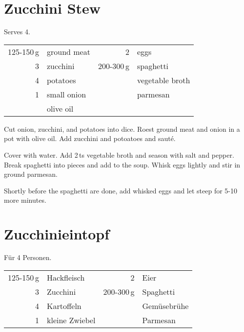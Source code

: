 \section{Zucchini Stew}

\begin{centering}

Serves 4.

\end{centering}

\begin{table}[H]
  \centering
    
  \begin{tabular*}{1\textwidth}{rlrl}
125-150\,g & ground meat & 2 & eggs \\
3 & zucchini & 200-300\,g & spaghetti \\
4 & potatoes & & vegetable broth \\
1 & small onion & & parmesan \\
 & olive oil & & \\
\end{tabular*}
\end{table}

\begin{Notes}
\item Cut onion, zucchini, and potatoes into dice. Roest ground meat and onion in a pot with olive oil. Add zucchini and potoatoes and saut\'{e}.

\item Cover with water. Add 2\,ts vegetable broth and season with salt and pepper. Break spaghetti into pieces and add to the soup. Whisk eggs lightly and stir in ground parmesan.

\item Shortly before the spaghetti are done, add whisked eggs and let steep for 5-10 more minutes.
\end{Notes}


\section*{Zucchinieintopf}

\begin{centering}

F\"{u}r 4 Personen.

\end{centering}

\begin{table}[H]
  \centering
    
  \begin{tabular*}{1\textwidth}{rlrl}
125-150\,g & Hackfleisch & 2 & Eier \\
3 & Zucchini & 200-300\,g & Spaghetti \\
4 & Kartoffeln & & Gemüsebrühe \\
1 & kleine Zwiebel & & Parmesan \\
  \end{tabular*}
\end{table}

